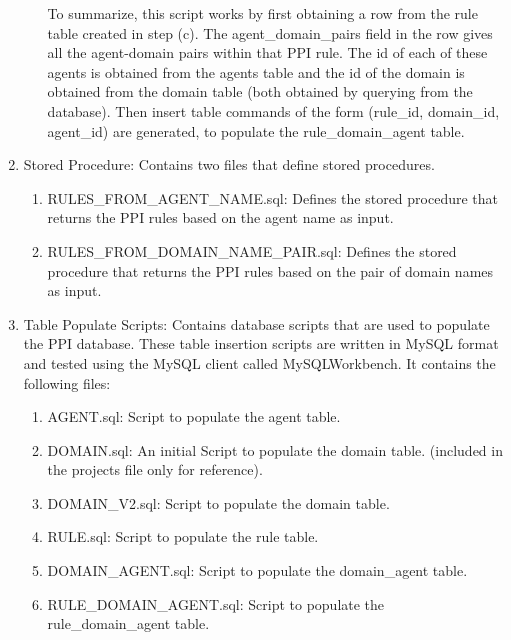 \documentclass[msc,deptreport,ai]{infthesis}      %
\begin{document}
\begin{enumerate}
\begin{enumerate}
 		To summarize, this script works by first obtaining a row from the rule table created in step (c). The agent\_domain\_pairs field in the row gives all the agent-domain pairs within that PPI rule. The id of each of these agents is obtained from the agents table and the id of the domain is obtained from the domain table (both obtained by querying from the database). Then insert table commands of the form (rule\_id, domain\_id, agent\_id) are generated, to populate the rule\_domain\_agent table.
 	\end{enumerate}
 	\item Stored Procedure: Contains two files that define stored procedures.
 	\begin{enumerate}
 		\item RULES\_FROM\_AGENT\_NAME.sql: Defines the stored procedure that returns the PPI rules based on the agent name as input.
 		\item RULES\_FROM\_DOMAIN\_NAME\_PAIR.sql: Defines the stored procedure that returns the PPI rules based on the pair of domain names as input.
 	\end{enumerate}
 
 	\item Table Populate Scripts: Contains database scripts that are used to populate the PPI database. These table insertion scripts are written in MySQL format and tested using the MySQL client called MySQLWorkbench. It contains the following files:
 	 	\begin{enumerate}
 		\item AGENT.sql: Script to populate the agent table.
		\item DOMAIN.sql: An initial Script to populate the domain table. (included in the projects file only for reference).
		\item DOMAIN\_V2.sql: Script to populate the domain table.
		\item RULE.sql: Script to populate the rule table.
		\item DOMAIN\_AGENT.sql: Script to populate the domain\_agent table.
		\item RULE\_DOMAIN\_AGENT.sql:  Script to populate the rule\_domain\_agent table.
 	\end{enumerate}
 

\end{enumerate}
\end{document}
